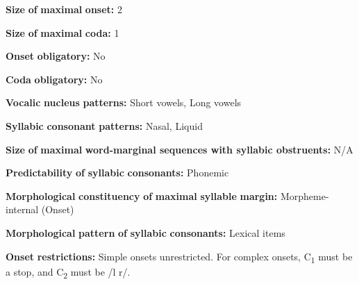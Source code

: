 \documentclass[output=paper]{langsci/langscibook}
\begin{document}
\begin{styleBody}
\textbf{Size} \textbf{of} \textbf{maximal} \textbf{onset:} 2
\end{styleBody}

\begin{styleBody}
\textbf{Size} \textbf{of} \textbf{maximal} \textbf{coda:} 1
\end{styleBody}

\begin{styleBody}
\textbf{Onset} \textbf{obligatory:} No
\end{styleBody}

\begin{styleBody}
\textbf{Coda} \textbf{obligatory:} No
\end{styleBody}

\begin{styleBody}
\textbf{Vocalic} \textbf{nucleus} \textbf{patterns:} Short vowels, Long vowels
\end{styleBody}

\begin{styleBody}
\textbf{Syllabic} \textbf{consonant} \textbf{patterns:} Nasal, Liquid
\end{styleBody}

\begin{styleBody}
\textbf{Size} \textbf{of} \textbf{maximal} \textbf{word{}-marginal sequences with syllabic obstruents:} N/A
\end{styleBody}

\begin{styleBody}
\textbf{Predictability} \textbf{of} \textbf{syllabic} \textbf{consonants:} Phonemic
\end{styleBody}

\begin{styleBody}
\textbf{Morphological} \textbf{constituency} \textbf{of} \textbf{maximal} \textbf{syllable} \textbf{margin:} Morpheme-internal (Onset)
\end{styleBody}

\begin{styleBody}
\textbf{Morphological} \textbf{pattern} \textbf{of} \textbf{syllabic} \textbf{consonants:} Lexical items
\end{styleBody}

\begin{styleBody}
\textbf{Onset} \textbf{restrictions:} Simple onsets unrestricted. For complex onsets, C\textsubscript{1} must be a stop, and C\textsubscript{2} must be /l r/. 
\end{styleBody}
\end{document}
